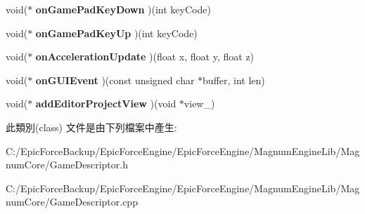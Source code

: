 \begin{DoxyCompactItemize}
\item 
void($\ast$ {\bfseries on\+Game\+Pad\+Key\+Down} )(int key\+Code)\hypertarget{class_magnum_1_1_game_descriptor_a5b669cdeebe31c646b97141034212c9e}{}\label{class_magnum_1_1_game_descriptor_a5b669cdeebe31c646b97141034212c9e}

\item 
void($\ast$ {\bfseries on\+Game\+Pad\+Key\+Up} )(int key\+Code)\hypertarget{class_magnum_1_1_game_descriptor_a44ad53bbdfb90285c49bd7fab83f3ac7}{}\label{class_magnum_1_1_game_descriptor_a44ad53bbdfb90285c49bd7fab83f3ac7}

\item 
void($\ast$ {\bfseries on\+Acceleration\+Update} )(float x, float y, float z)\hypertarget{class_magnum_1_1_game_descriptor_a009e80a4303d024c8887497fa95146a0}{}\label{class_magnum_1_1_game_descriptor_a009e80a4303d024c8887497fa95146a0}

\item 
void($\ast$ {\bfseries on\+G\+U\+I\+Event} )(const unsigned char $\ast$buffer, int len)\hypertarget{class_magnum_1_1_game_descriptor_af2cbbd6cfa0da65adce56615def1cafe}{}\label{class_magnum_1_1_game_descriptor_af2cbbd6cfa0da65adce56615def1cafe}

\item 
void($\ast$ {\bfseries add\+Editor\+Project\+View} )(void $\ast$view\+\_\+)\hypertarget{class_magnum_1_1_game_descriptor_ab27dfea4901d1785a6ac970b0b1c2371}{}\label{class_magnum_1_1_game_descriptor_ab27dfea4901d1785a6ac970b0b1c2371}

\end{DoxyCompactItemize}


此類別(class) 文件是由下列檔案中產生\+:\begin{DoxyCompactItemize}
\item 
C\+:/\+Epic\+Force\+Backup/\+Epic\+Force\+Engine/\+Epic\+Force\+Engine/\+Magnum\+Engine\+Lib/\+Magnum\+Core/Game\+Descriptor.\+h\item 
C\+:/\+Epic\+Force\+Backup/\+Epic\+Force\+Engine/\+Epic\+Force\+Engine/\+Magnum\+Engine\+Lib/\+Magnum\+Core/Game\+Descriptor.\+cpp\end{DoxyCompactItemize}
